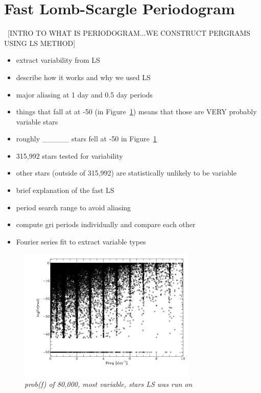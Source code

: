 \documentclass[aps,prl,twocolumn,superscriptaddress]{revtex4-1}
\begin{document}
\section{Fast Lomb-Scargle Periodogram}

~[INTRO TO WHAT IS PERIODOGRAM...WE CONSTRUCT PERGRAMS USING LS METHOD]
\begin{itemize}
	\item{} extract variability from LS
	\item{} describe how it works and why we used LS
	\item{} major aliasing at 1 day and 0.5 day periods
	\item{} things that fall at at -50 (in Figure~\ref{fig:quartiles}) means that those are VERY probably variable stars
	\item{} roughly \_\_\_\_\_ stars fell at -50 in Figure~\ref{fig:quartiles}
	\item{} 315,992 stars tested for variability
	\item{} other stars (outside of 315,992) are statistically unlikely to be variable
\end{itemize}

\begin{itemize}
	\item{} brief explanation of the fast LS
	\item{} period search range to avoid aliasing
	\item{} compute gri periods individually and compare each other 
	\item{} Fourier series fit to extract variable types
\end{itemize}



\begin{figure}[H]
 \centering
 	\includegraphics[width=3.35in]{figures/fromJT/probf.png}
 \caption{\it \small{prob(f) of 80,000, most variable, stars LS was run on}}
 \label{fig:quartiles}
\end{figure}
\end{document}

